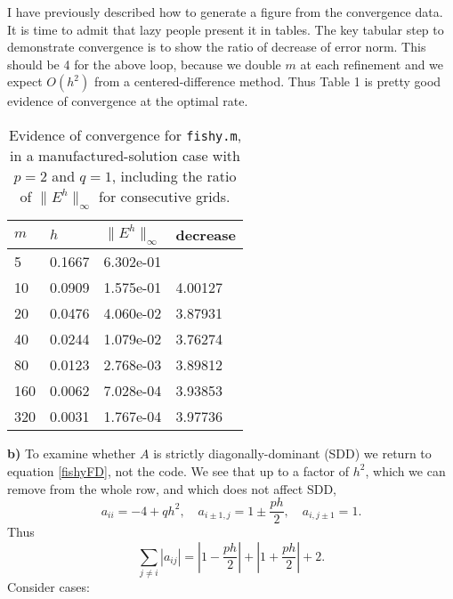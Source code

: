 \documentclass[11pt]{amsart}
\newcommand{\epart}[1]{\medskip\noindent\textbf{#1)}}
\begin{document}
I have previously described how to generate a figure from the convergence data.  It is time to admit that lazy people present it in tables.  The key tabular step to demonstrate convergence is to show the ratio of decrease of error norm.  This should be 4 for the above loop, because we double $m$ at each refinement and we expect $O(h^2)$ from a centered-difference method.  Thus Table 1 is pretty good evidence of convergence at the optimal rate.
\begin{table}
\begin{tabular}{llll}
$m$ & $h$ & $\|E^h\|_\infty$ & decrease \\ \hline
5 & 0.1667 & 6.302e-01 & \\
10 & 0.0909 & 1.575e-01 & 4.00127 \\
20 & 0.0476 & 4.060e-02 & 3.87931 \\
40 & 0.0244 & 1.079e-02 & 3.76274 \\
80 & 0.0123 & 2.768e-03 & 3.89812 \\
160 & 0.0062 & 7.028e-04 & 3.93853 \\
320 & 0.0031 & 1.767e-04 & 3.97736
\end{tabular}

\bigskip
\caption{Evidence of convergence for \texttt{fishy.m}, in a manufactured-solution case with $p=2$ and $q=1$, including the ratio of $\|E^h\|_\infty$ for consecutive grids.}
\end{table}

\epart{b}  To examine whether $A$ is strictly diagonally-dominant (SDD) we return to equation \eqref{fishyFD}, not the code.  We see that up to a factor of $h^2$, which we can remove from the whole row, and which does not affect SDD,
    $$a_{ii} = -4 + q h^2, \quad a_{i\pm 1,j} = 1 \pm \frac{ph}{2}, \quad a_{i,j\pm 1} = 1.$$
Thus
    $$\sum_{j\ne i} |a_{ij}| = \left|1 - \frac{ph}{2}\right| + \left|1 + \frac{ph}{2}\right| + 2.$$
Consider cases:
\end{document}

